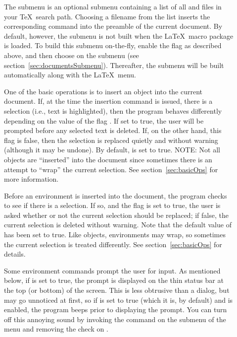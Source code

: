 \documentclass{report}
\begin{document}
\begin{description}
	\item[] The  submenu is an 
	optional submenu containing a list of all  and 
	 files in your \TeX\ search path.  Choosing a filename 
	from the list inserts the corresponding  command 
	into the preamble of the current document.  By default, however, the 
	 submenu is not built when the \LaTeX\ macro package 
	is loaded.  To build this submenu on-the-fly, enable the flag 
	 as described above, and then choose 
	 on the  submenu (see 
	section~\ref{sec:documentsSubmenu}).  Thereafter, the 
	 submenu will be built automatically along with the 
	\LaTeX\ menu.

	\item[] One of the basic  
	operations is to insert an object into the current document.  If, at 
	the time the insertion command is issued, there is a selection 
	(i.e., text is highlighted), then the program behaves differently 
	depending on the value of the flag .  If set 
	to true, the user will be prompted before any selected text is 
	deleted.  If, on the other hand, this flag is false, then the 
	selection is replaced quietly and without warning (although it may 
	be undone).  By default,  is set to true.  
	NOTE: Not all objects are ``inserted'' into the document since 
	sometimes there is an attempt to ``wrap'' the current selection.  
	See section~\ref{sec:basicOps} for more information.

	\item[] Before an environment is inserted 
	into the document, the program checks to see if there is a 
	selection.  If so, and the flag  is set to 
	true, the user is asked whether or not the current selection should 
	be replaced; if false, the current selection is deleted without 
	warning.  Note that the default value of  has 
	been set to true.  Like objects, environments may wrap, so sometimes 
	the current selection is treated differently.  See 
	section~\ref{sec:basicOps} for details.

	\item[] Some environment commands prompt the user for
	input.  As mentioned below, if  is set to true, the
	prompt is displayed on the thin status bar at the top (or bottom) of the
	screen.  This is less obtrusive than a dialog, but may go unnoticed at
	first, so if  is set to true (which it is, by
	default) and  is enabled, the program beeps prior to
	displaying the prompt.  You can turn off this annoying sound by invoking
	the  command on the  submenu of the
	 menu and removing the check on .


\end{description}
\end{document}
